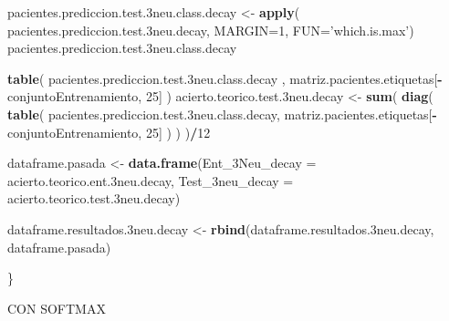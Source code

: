 \documentclass[]{article}
\newenvironment{Shaded}{\begin{snugshade}}{\end{snugshade}}
\newcommand{\KeywordTok}[1]{\textcolor[rgb]{0.13,0.29,0.53}{\textbf{#1}}}
\newcommand{\DataTypeTok}[1]{\textcolor[rgb]{0.13,0.29,0.53}{#1}}
\newcommand{\DecValTok}[1]{\textcolor[rgb]{0.00,0.00,0.81}{#1}}
\newcommand{\StringTok}[1]{\textcolor[rgb]{0.31,0.60,0.02}{#1}}
\newcommand{\OperatorTok}[1]{\textcolor[rgb]{0.81,0.36,0.00}{\textbf{#1}}}
\newcommand{\NormalTok}[1]{#1}
\begin{document}
\begin{Shaded}
\begin{Highlighting}[]
\NormalTok{  pacientes.prediccion.test.3neu.class.decay <-}\StringTok{ }\KeywordTok{apply}\NormalTok{( pacientes.prediccion.test.3neu.decay, }\DataTypeTok{MARGIN=}\DecValTok{1}\NormalTok{, }\DataTypeTok{FUN=}\StringTok{'which.is.max'}\NormalTok{)}
\NormalTok{  pacientes.prediccion.test.3neu.class.decay}
  
  \KeywordTok{table}\NormalTok{( pacientes.prediccion.test.3neu.class.decay , matriz.pacientes.etiquetas[}\OperatorTok{-}\NormalTok{conjuntoEntrenamiento, }\DecValTok{25}\NormalTok{] )}
\NormalTok{  acierto.teorico.test.3neu.decay <-}\StringTok{ }\KeywordTok{sum}\NormalTok{( }\KeywordTok{diag}\NormalTok{( }\KeywordTok{table}\NormalTok{( pacientes.prediccion.test.3neu.class.decay, matriz.pacientes.etiquetas[}\OperatorTok{-}\NormalTok{conjuntoEntrenamiento, }\DecValTok{25}\NormalTok{] ) ) )}\OperatorTok{/}\DecValTok{12}
  
  
\NormalTok{  dataframe.pasada <-}\StringTok{ }\KeywordTok{data.frame}\NormalTok{(}\DataTypeTok{Ent_3Neu_decay =}\NormalTok{ acierto.teorico.ent.3neu.decay,}
                                 \DataTypeTok{Test_3neu_decay =}\NormalTok{ acierto.teorico.test.3neu.decay)}
  
\NormalTok{  dataframe.resultados.3neu.decay <-}\StringTok{ }\KeywordTok{rbind}\NormalTok{(dataframe.resultados.3neu.decay, dataframe.pasada)}
  
\NormalTok{\}}
\end{Highlighting}
\end{Shaded}

CON SOFTMAX
\end{document}
